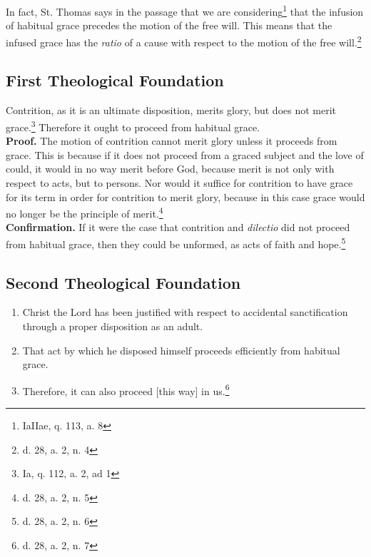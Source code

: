 \documentclass[11pt]{memoir}
\begin{document}
    \noindent In fact, St. Thomas says in the passage that we are
    considering\footnote{IaIIae, q. 113, a. 8} that the infusion of habitual grace precedes the motion of the free will.
    This means that the infused grace has the \emph{ratio} of a cause with respect to the motion of the free
    will.\footnote{d. 28, a. 2, n. 4}

    \subsection*{First Theological Foundation}

    \noindent Contrition, as it is an ultimate disposition, merits glory, but does not merit grace.\footnote{Ia, q. 112, a. 2, ad
    1} Therefore it ought to proceed from habitual grace. \\

    \noindent \textbf{Proof.} The motion of contrition cannot merit glory unless it proceeds from grace. This is because if it
    does not proceed from a graced subject and the love of could, it would in no way merit before God, because merit is
    not only with respect to acts, but to persons. Nor would it suffice for contrition to have grace for its term in
    order for contrition to merit glory, because in this case grace would no longer be the principle of
    merit.\footnote{d. 28, a. 2, n. 5} \\

    \noindent \textbf{Confirmation.} If it were the case that contrition and \emph{dilectio} did not proceed from habitual grace,
    then they could be unformed, as acts of faith and hope.\footnote{d. 28, a. 2, n. 6} 

    \subsection*{Second Theological Foundation}

    \begin{enumerate}
        
        \item Christ the Lord has been justified with respect to accidental sanctification through a proper disposition
            as an adult.

        \item That act by which he disposed himself proceeds efficiently from habitual grace.

        \item Therefore, it can also proceed [this way] in us.\footnote{d. 28, a. 2, n. 7}

    \end{enumerate}
\end{document}
